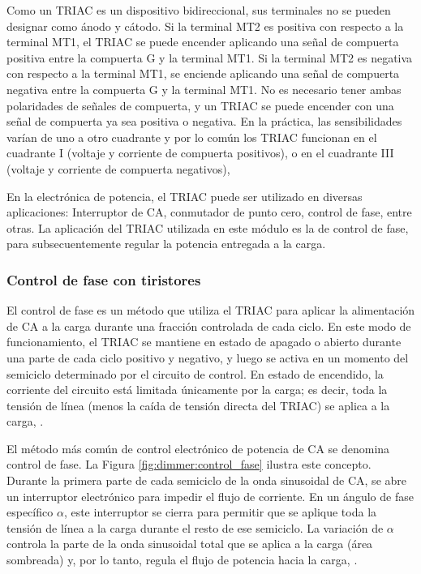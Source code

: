 Como un TRIAC es un dispositivo bidireccional, sus terminales no se pueden designar como ánodo y cátodo. Si la terminal MT2 es positiva con respecto a la terminal MT1, el TRIAC se puede encender aplicando una señal de compuerta positiva entre la compuerta G y la terminal MT1. Si la terminal MT2 es negativa con respecto a la terminal MT1, se enciende aplicando una señal de compuerta negativa entre la compuerta G y la terminal MT1. No es necesario tener ambas polaridades de señales de compuerta, y un TRIAC se puede encender con una señal de compuerta ya sea positiva o negativa. En la práctica, las sensibilidades varían de uno a otro cuadrante y por lo común los TRIAC funcionan en el cuadrante I (voltaje y corriente de compuerta positivos), o en el cuadrante III (voltaje y corriente de compuerta negativos), \parencite{RASHID-SPANISH}

En la electrónica de potencia, el TRIAC puede ser utilizado en diversas aplicaciones: Interruptor de CA, conmutador de punto cero, control de fase, entre otras. La aplicación del TRIAC utilizada en este módulo es la de control de fase, para subsecuentemente regular la potencia entregada a la carga.

\subsubsection{Control de fase con tiristores}

El control de fase es un método que utiliza el TRIAC para aplicar la alimentación de CA a la carga durante una fracción controlada de cada ciclo. En este modo de funcionamiento, el TRIAC se mantiene en estado de apagado o abierto durante una parte de cada ciclo positivo y negativo, y luego se activa en un momento del semiciclo determinado por el circuito de control. En estado de encendido, la corriente del circuito está limitada únicamente por la carga; es decir, toda la tensión de línea (menos la caída de tensión directa del TRIAC) se aplica a la carga, \parencite{ON-ThyristorHandbook}.

El método más común de control electrónico de potencia de CA se denomina control de fase. La Figura \ref{fig:dimmer:control_fase} ilustra este concepto. Durante la primera parte de cada semiciclo de la onda sinusoidal de CA, se abre un interruptor electrónico para impedir el flujo de corriente. En un ángulo de fase específico $\alpha$, este interruptor se cierra para permitir que se aplique toda la tensión de línea a la carga durante el resto de ese semiciclo. La variación de $\alpha$ controla la parte de la onda sinusoidal total que se aplica a la carga (área sombreada) y, por lo tanto, regula el flujo de potencia hacia la carga, \parencite{ON-ThyristorHandbook}.

